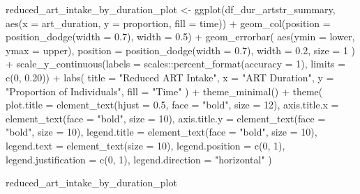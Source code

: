 \documentclass[
  letterpaper,
  DIV=11,
  numbers=noendperiod]{scrartcl}
\newenvironment{Shaded}{\begin{snugshade}}{\end{snugshade}}
\newcommand{\AttributeTok}[1]{\textcolor[rgb]{0.40,0.45,0.13}{#1}}
\newcommand{\DecValTok}[1]{\textcolor[rgb]{0.68,0.00,0.00}{#1}}
\newcommand{\FloatTok}[1]{\textcolor[rgb]{0.68,0.00,0.00}{#1}}
\newcommand{\FunctionTok}[1]{\textcolor[rgb]{0.28,0.35,0.67}{#1}}
\newcommand{\NormalTok}[1]{\textcolor[rgb]{0.00,0.23,0.31}{#1}}
\newcommand{\OtherTok}[1]{\textcolor[rgb]{0.00,0.23,0.31}{#1}}
\newcommand{\SpecialCharTok}[1]{\textcolor[rgb]{0.37,0.37,0.37}{#1}}
\newcommand{\StringTok}[1]{\textcolor[rgb]{0.13,0.47,0.30}{#1}}
\begin{document}
\begin{Shaded}
\begin{Highlighting}[]
\NormalTok{reduced\_art\_intake\_by\_duration\_plot }\OtherTok{\textless{}{-}} \FunctionTok{ggplot}\NormalTok{(df\_dur\_artstr\_summary, }\FunctionTok{aes}\NormalTok{(}\AttributeTok{x =}\NormalTok{ art\_duration, }\AttributeTok{y =}\NormalTok{ proportion, }\AttributeTok{fill =}\NormalTok{ time)) }\SpecialCharTok{+}
  \FunctionTok{geom\_col}\NormalTok{(}\AttributeTok{position =} \FunctionTok{position\_dodge}\NormalTok{(}\AttributeTok{width =} \FloatTok{0.7}\NormalTok{), }\AttributeTok{width =} \FloatTok{0.5}\NormalTok{) }\SpecialCharTok{+}
  \FunctionTok{geom\_errorbar}\NormalTok{(}
    \FunctionTok{aes}\NormalTok{(}\AttributeTok{ymin =}\NormalTok{ lower, }\AttributeTok{ymax =}\NormalTok{ upper),}
    \AttributeTok{position =} \FunctionTok{position\_dodge}\NormalTok{(}\AttributeTok{width =} \FloatTok{0.7}\NormalTok{),}
    \AttributeTok{width =} \FloatTok{0.2}\NormalTok{,}
    \AttributeTok{size =} \DecValTok{1}
\NormalTok{  ) }\SpecialCharTok{+}
  \FunctionTok{scale\_y\_continuous}\NormalTok{(}\AttributeTok{labels =}\NormalTok{ scales}\SpecialCharTok{::}\FunctionTok{percent\_format}\NormalTok{(}\AttributeTok{accuracy =} \DecValTok{1}\NormalTok{), }\AttributeTok{limits =} \FunctionTok{c}\NormalTok{(}\DecValTok{0}\NormalTok{, }\FloatTok{0.20}\NormalTok{)) }\SpecialCharTok{+}
  \FunctionTok{labs}\NormalTok{(}
    \AttributeTok{title =} \StringTok{"Reduced ART Intake"}\NormalTok{,}
    \AttributeTok{x =} \StringTok{"ART Duration"}\NormalTok{,}
    \AttributeTok{y =} \StringTok{"Proportion of Individuals"}\NormalTok{,}
    \AttributeTok{fill =} \StringTok{"Time"}
\NormalTok{  ) }\SpecialCharTok{+}
  \FunctionTok{theme\_minimal}\NormalTok{() }\SpecialCharTok{+}
  \FunctionTok{theme}\NormalTok{(}
    \AttributeTok{plot.title =} \FunctionTok{element\_text}\NormalTok{(}\AttributeTok{hjust =} \FloatTok{0.5}\NormalTok{, }\AttributeTok{face =} \StringTok{"bold"}\NormalTok{, }\AttributeTok{size =} \DecValTok{12}\NormalTok{),}
    \AttributeTok{axis.title.x =} \FunctionTok{element\_text}\NormalTok{(}\AttributeTok{face =} \StringTok{"bold"}\NormalTok{, }\AttributeTok{size =} \DecValTok{10}\NormalTok{),}
    \AttributeTok{axis.title.y =} \FunctionTok{element\_text}\NormalTok{(}\AttributeTok{face =} \StringTok{"bold"}\NormalTok{, }\AttributeTok{size =} \DecValTok{10}\NormalTok{),}
    \AttributeTok{legend.title =} \FunctionTok{element\_text}\NormalTok{(}\AttributeTok{face =} \StringTok{"bold"}\NormalTok{, }\AttributeTok{size =} \DecValTok{10}\NormalTok{),}
    \AttributeTok{legend.text =} \FunctionTok{element\_text}\NormalTok{(}\AttributeTok{size =} \DecValTok{10}\NormalTok{),}
    \AttributeTok{legend.position =} \FunctionTok{c}\NormalTok{(}\DecValTok{0}\NormalTok{, }\DecValTok{1}\NormalTok{),}
    \AttributeTok{legend.justification =} \FunctionTok{c}\NormalTok{(}\DecValTok{0}\NormalTok{, }\DecValTok{1}\NormalTok{),}
    \AttributeTok{legend.direction =} \StringTok{"horizontal"}
\NormalTok{  )}

\NormalTok{reduced\_art\_intake\_by\_duration\_plot}
\end{Highlighting}
\end{Shaded}
\end{document}
